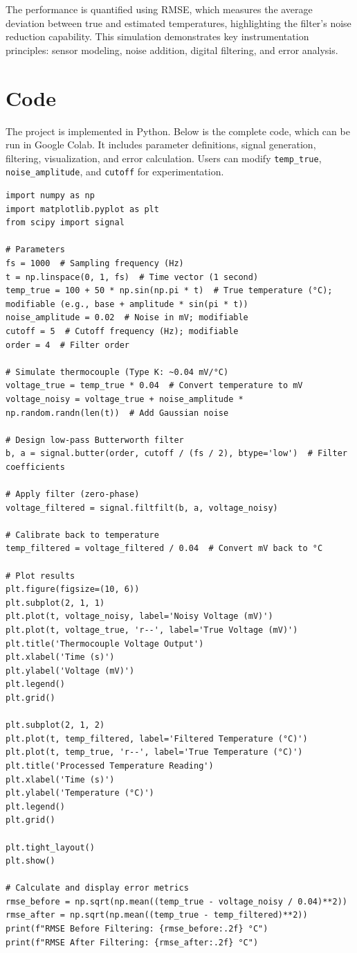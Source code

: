 \documentclass[12pt]{article}
\begin{document}
The performance is quantified using RMSE, which measures the average deviation between true and estimated temperatures, highlighting the filter's noise reduction capability. This simulation demonstrates key instrumentation principles: sensor modeling, noise addition, digital filtering, and error analysis.

\section*{Code}
The project is implemented in Python. Below is the complete code, which can be run in Google Colab. It includes parameter definitions, signal generation, filtering, visualization, and error calculation. Users can modify \texttt{temp\_true}, \texttt{noise\_amplitude}, and \texttt{cutoff} for experimentation.

\begin{lstlisting}
import numpy as np
import matplotlib.pyplot as plt
from scipy import signal

# Parameters
fs = 1000  # Sampling frequency (Hz)
t = np.linspace(0, 1, fs)  # Time vector (1 second)
temp_true = 100 + 50 * np.sin(np.pi * t)  # True temperature (°C); modifiable (e.g., base + amplitude * sin(pi * t))
noise_amplitude = 0.02  # Noise in mV; modifiable
cutoff = 5  # Cutoff frequency (Hz); modifiable
order = 4  # Filter order

# Simulate thermocouple (Type K: ~0.04 mV/°C)
voltage_true = temp_true * 0.04  # Convert temperature to mV
voltage_noisy = voltage_true + noise_amplitude * np.random.randn(len(t))  # Add Gaussian noise

# Design low-pass Butterworth filter
b, a = signal.butter(order, cutoff / (fs / 2), btype='low')  # Filter coefficients

# Apply filter (zero-phase)
voltage_filtered = signal.filtfilt(b, a, voltage_noisy)

# Calibrate back to temperature
temp_filtered = voltage_filtered / 0.04  # Convert mV back to °C

# Plot results
plt.figure(figsize=(10, 6))
plt.subplot(2, 1, 1)
plt.plot(t, voltage_noisy, label='Noisy Voltage (mV)')
plt.plot(t, voltage_true, 'r--', label='True Voltage (mV)')
plt.title('Thermocouple Voltage Output')
plt.xlabel('Time (s)')
plt.ylabel('Voltage (mV)')
plt.legend()
plt.grid()

plt.subplot(2, 1, 2)
plt.plot(t, temp_filtered, label='Filtered Temperature (°C)')
plt.plot(t, temp_true, 'r--', label='True Temperature (°C)')
plt.title('Processed Temperature Reading')
plt.xlabel('Time (s)')
plt.ylabel('Temperature (°C)')
plt.legend()
plt.grid()

plt.tight_layout()
plt.show()

# Calculate and display error metrics
rmse_before = np.sqrt(np.mean((temp_true - voltage_noisy / 0.04)**2))
rmse_after = np.sqrt(np.mean((temp_true - temp_filtered)**2))
print(f"RMSE Before Filtering: {rmse_before:.2f} °C")
print(f"RMSE After Filtering: {rmse_after:.2f} °C")
\end{lstlisting}
\end{document}
